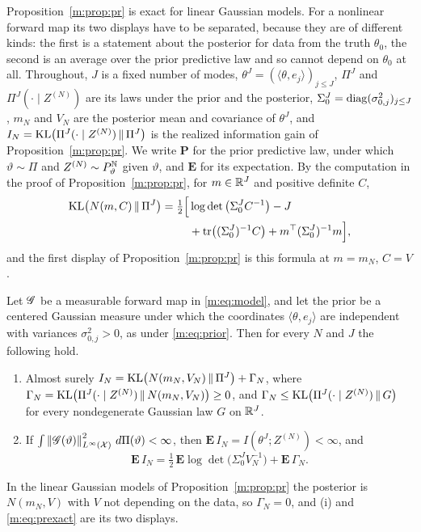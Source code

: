 Proposition~\ref{m:prop:pr} is exact for linear Gaussian models. For a nonlinear forward map its two displays have to be separated, because they are of different kinds: the first is a statement about the posterior for data from the truth $\theta_0$, the second is an average over the prior predictive law and so cannot depend on $\theta_0$ at all. Throughout, $J$ is a fixed number of modes, $\theta^J=(\langle\theta,e_j\rangle)_{j\le J}$, $\Pi^J$ and $\Pi^J(\cdot\mid Z^{(N)})$ are its laws under the prior and the posterior, $\Sigma^J_0=\operatorname{diag}(\sigma^2_{0,j})_{j\le J}$, $m_N$ and $V_N$ are the posterior mean and covariance of $\theta^J$, and $I_N=\mathrm{KL}\big(\Pi^J(\cdot\mid Z^{(N)})\,\|\,\Pi^J\big)$ is the realized information gain of Proposition~\ref{m:prop:pr}. We write $\mathbf P$ for the prior predictive law, under which $\vartheta\sim\Pi$ and $Z^{(N)}\sim P^{\mathbb{N}}_\vartheta$ given $\vartheta$, and $\mathbf E$ for its expectation. By the computation in the proof of Proposition~\ref{m:prop:pr}, for $m\in\mathbb{R}^J$ and positive definite $C$,
\[
\begin{aligned}
\mathrm{KL}\big(N(m,C)\,\|\,\Pi^J\big)=\tfrac12\Big[&\log\det\big(\Sigma^J_0C^{-1}\big)-J\\
&{}+\mathrm{tr}\big((\Sigma^J_0)^{-1}C\big)+m^\top(\Sigma^J_0)^{-1}m\Big],
\end{aligned}
\]
and the first display of Proposition~\ref{m:prop:pr} is this formula at $m=m_N$, $C=V$.

\begin{lemma}\label{m:lem:prexact}
Let $\mathscr{G}$ be a measurable forward map in \eqref{m:eq:model}, and let the prior be a centered Gaussian measure under which the coordinates $\langle\theta,e_j\rangle$ are independent with variances $\sigma^2_{0,j}>0$, as under \eqref{m:eq:prior}. Then for every $N$ and $J$ the following hold.
\begin{enumerate}[label=(\roman*),nosep]
\item Almost surely $I_N=\mathrm{KL}\big(N(m_N,V_N)\,\|\,\Pi^J\big)+\Gamma_N$, where $\Gamma_N=\mathrm{KL}\big(\Pi^J(\cdot\mid Z^{(N)})\,\|\,N(m_N,V_N)\big)\ge0$, and $\Gamma_N\le\mathrm{KL}\big(\Pi^J(\cdot\mid Z^{(N)})\,\|\,G\big)$ for every nondegenerate Gaussian law $G$ on $\mathbb{R}^J$.
\item If $\int\left\|\mathscr{G}(\vartheta)\right\|^2_{L^\infty(\mathcal X)}\,d\Pi(\vartheta)<\infty$, then $\mathbf E\,I_N=I(\theta^J;Z^{(N)})<\infty$, and
\begin{equation}\label{m:eq:prexact}
\mathbf E\,I_N=\tfrac12\,\mathbf E\log\det\big(\Sigma^J_0V_N^{-1}\big)+\mathbf E\,\Gamma_N .
\end{equation}
\end{enumerate}
In the linear Gaussian models of Proposition~\ref{m:prop:pr} the posterior is $N(m_N,V)$ with $V$ not depending on the data, so $\Gamma_N=0$, and (i) and \eqref{m:eq:prexact} are its two displays.
\end{lemma}

